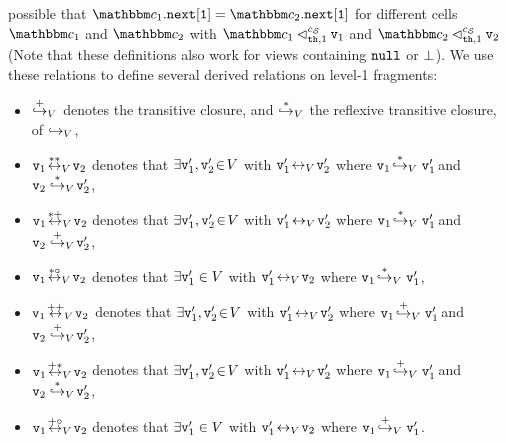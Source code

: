 possible that
  $\cell_1.{\tt next[1]} = \cell_2.{\tt next[1]}$
for different cells  $\cell_1$ and $\cell_2$ with
  $\cell_1 \lsatfrag{1}{{\thread}}{\sconf} \frag_1$ and
  $\cell_2 \lsatfrag{1}{{\thread}}{\sconf} \frag_2$
(Note that these definitions also work for views containing
${\tt null}$ or $\bot$).
We use these relations to define several derived relations on level-1 fragments:
\begin{itemize}
\item $\overset{+}\hookrightarrow_{V}$ denotes the transitive closure,
  and
   $\overset{*}\hookrightarrow_{V}$ the reflexive transitive closure, of
  $\hookrightarrow_{V}$,
\item $\mathtt{v}_1 \!  \overset{**}\leftrightarrow_{V}  \! \mathtt{v}_2$ denotes that 
  $\exists \mathtt{v}_1',\mathtt{v}_2' \!\in\! V$ with $\mathtt{v}_1' \! \leftrightarrow_{V} \! \mathtt{v}_2'$ where
  $\mathtt{v}_1 \!  \overset{*}\hookrightarrow_{V} \mathtt{v}_1' \!$ and $\mathtt{v}_2  \overset{*}\hookrightarrow_{V} \! \mathtt{v}_2'$,
\item $\mathtt{v}_1 \!  \overset{*+}\leftrightarrow_{V}  \! \mathtt{v}_2$ denotes that
  $\exists \mathtt{v}_1', \mathtt{v}_2' \!\in\! V$ with $\mathtt{v}_1' \! \leftrightarrow_{V} \! \mathtt{v}_2'$ where
  $\mathtt{v}_1 \!  \overset{*}\hookrightarrow_{V} \mathtt{v}_1' \!$ and $\mathtt{v}_2  \overset{+}\hookrightarrow_{V} \! \mathtt{v}_2'$,
\item $\mathtt{v}_1 \!  \overset{*\circ}\leftrightarrow_{V}  \! \mathtt{v}_2$ denotes that $\exists \mathtt{v}_1' \in V$ with $\mathtt{v}_1' \! \leftrightarrow_{V} \! \mathtt{v}_2$ where
  $\mathtt{v}_1 \!  \overset{*}\hookrightarrow_{V} \mathtt{v}_1'$,
\item $\mathtt{v}_1 \!  \overset{++}\leftrightarrow_{V}  \! \mathtt{v}_2$ denotes that
  $\exists \mathtt{v}_1',\mathtt{v}_2' \!\in\! V$ with $\mathtt{v}_1' \! \leftrightarrow_{V} \! \mathtt{v}_2'$ where
  $\mathtt{v}_1 \!  \overset{+}\hookrightarrow_{V} \mathtt{v}_1' \!$ and $\mathtt{v}_2  \overset{+}\hookrightarrow_{V} \! \mathtt{v}_2'$,
\item $\mathtt{v}_1 \!  \overset{+*}\leftrightarrow_{V}  \! \mathtt{v}_2$ denotes that
  $\exists \mathtt{v}_1',\mathtt{v}_2' \!\in\! V$ with $\mathtt{v}_1' \! \leftrightarrow_{V} \! \mathtt{v}_2'$ where
  $\mathtt{v}_1 \!  \overset{+}\hookrightarrow_{V} \mathtt{v}_1' \!$ and $\mathtt{v}_2  \overset{*}\hookrightarrow_{V} \! \mathtt{v}_2'$,
\item $\mathtt{v}_1 \!  \overset{+\circ}\leftrightarrow_{V}  \! \mathtt{v}_2$ denotes that
  $\exists \mathtt{v}_1' \in V$ with $\mathtt{v}_1' \! \leftrightarrow_{V} \! \mathtt{v}_2$ where
  $\mathtt{v}_1 \!  \overset{+}\hookrightarrow_{V} \mathtt{v}_1'$.
\end{itemize}
